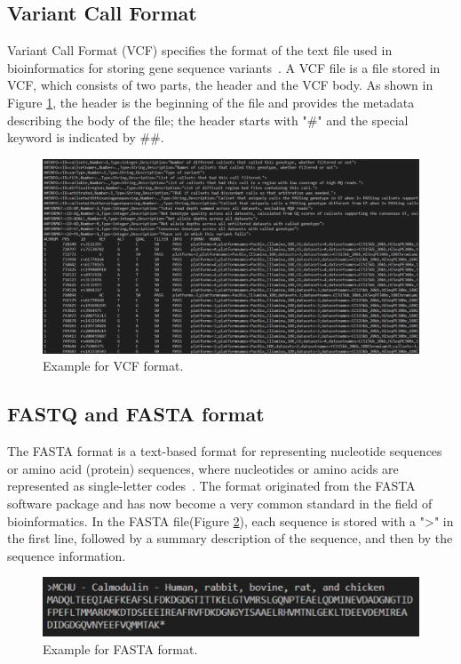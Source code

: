 \documentclass[PhD]{PHlab-thesis}
\begin{document}
\subsection{Variant Call Format}
Variant Call Format (VCF) specifies the format of the text file used in bioinformatics for storing gene sequence variants~\cite{Danecek2011VCF}. A VCF file is a file stored in VCF, which consists of two parts, the header and the VCF body. As shown in Figure \ref{fig:VCF format}, the header is the beginning of the file and provides the metadata describing the body of the file; the header starts with "\#" and the special keyword is indicated by \#\#.

\begin{figure}[h!]
	\centering
	\includegraphics[scale=0.3]{figures/Example_for_VCF_file.png}
	\caption{Example for VCF format.}
	\label{fig:VCF format} %
\end{figure}

\subsection{FASTQ and FASTA format}
The FASTA format is a text-based format for representing nucleotide sequences or amino acid (protein) sequences, where nucleotides or amino acids are represented as single-letter codes~\cite{Lipman1985FASTA}. The format originated from the FASTA software package and has now become a very common standard in the field of bioinformatics. In the FASTA file(Figure \ref{fig:FASTA format}), each sequence is stored with a ">" in the first line, followed by a summary description of the sequence, and then by the sequence information.

\begin{figure}[h!]
	\centering
	\includegraphics[scale=0.4]{figures/Example_for_FASTA_format.png}
	\caption{Example for FASTA format.}
	\label{fig:FASTA format} %
\end{figure}
\end{document}

